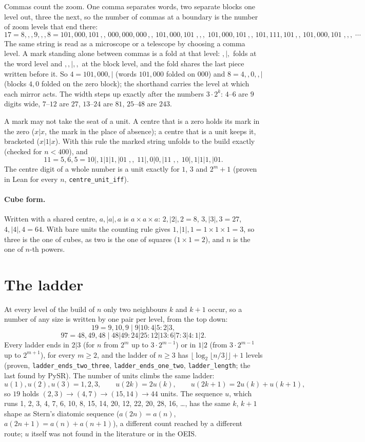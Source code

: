 \documentclass[11pt]{article}
\begin{document}
Commas count the zoom. One comma separates words, two separate blocks one level out, three the next, so the number of commas at a boundary is the number of zoom levels that end there:
\[ \scriptstyle 17 = 8,,,9,,,8 = 101,000,101\,,,\,000,000,000\,,,\,101,000,101\;,,,\;101,000,101\,,,\,101,111,101\,,,\,101,000,101\;,,,\;\cdots \]
The same string is read as a microscope or a telescope by choosing a comma level. A mark standing alone between commas is a fold at that level: $,|,$ folds at the word level and $,,|,,$ at the block level, and the fold shares the last piece written before it. So $4 = 101,000,|$ (words $101,000$ folded on $000$) and $8 = 4,,0,,|$ (blocks $4,0$ folded on the zero block); the shorthand carries the level at which each mirror acts. The width steps up exactly after the numbers $3\cdot2^k$: $4$--$6$ are $9$ digits wide, $7$--$12$ are $27$, $13$--$24$ are $81$, $25$--$48$ are $243$.

A mark may not take the seat of a unit. A centre that is a zero holds its mark in the zero ($x|x$, the mark in the place of absence); a centre that is a unit keeps it, bracketed ($x|1|x$). With this rule the marked string unfolds to the build exactly (checked for $n<400$), and
\[ \scriptstyle 11 = 5,6,5 = 10|,1|1|1,|01\;,,\;11|,0|0,|11\;,,\;10|,1|1|1,|01. \]
The centre digit of a whole number is a unit exactly for $1$, $3$ and $2^m+1$ (proven in Lean for every $n$, \texttt{centre\_unit\_iff}).

\paragraph{Cube form.} Written with a shared centre, $a,|a|,a$ is $a\times a\times a$: $2,|2|,2 = 8$, $3,|3|,3 = 27$, $4,|4|,4 = 64$. With bare units the counting rule gives $1,|1|,1 = 1\times1\times1 = 3$, so three is the one of cubes, as two is the one of squares ($1\times1 = 2$), and $n$ is the one of $n$-th powers.

\section{The ladder}
At every level of the build of $n$ only two neighbours $k$ and $k+1$ occur, so a number of any size is written by one pair per level, from the top down:
\[ 19 = 9,10,9 \;\big|\; 9|10 : 4|5 : 2|3, \] \[ 97 = 48,49,48 \;\big|\; 48|49 : 24|25 : 12|13 : 6|7 : 3|4 : 1|2. \]
Every ladder ends in $2|3$ (for $n$ from $2^m$ up to $3\cdot2^{m-1}$) or in $1|2$ (from $3\cdot2^{m-1}$ up to $2^{m+1}$), for every $m\ge2$, and the ladder of $n\ge3$ has $\lfloor\log_2\lfloor n/3\rfloor\rfloor+1$ levels (proven, \texttt{ladder\_ends\_two\_three}, \texttt{ladder\_ends\_one\_two}, \texttt{ladder\_length}; the last found by PySR). The number of units climbs the same ladder:
\[ u(1),u(2),u(3) = 1,2,3,\qquad u(2k) = 2u(k),\qquad u(2k{+}1) = 2u(k)+u(k{+}1), \]
so $19$ holds $(2,3)\to(4,7)\to(15,14)\to 44$ units. The sequence $u$, which runs 1, 2, 3, 4, 7, 6, 10, 8, 15, 14, 20, 12, 22, 20, 28, 16, \dots, has the same $k$, $k+1$ shape as Stern's diatomic sequence ($a(2n)=a(n)$, $a(2n{+}1)=a(n)+a(n{+}1)$), a different count reached by a different route; $u$ itself was not found in the literature or in the OEIS.
\end{document}
